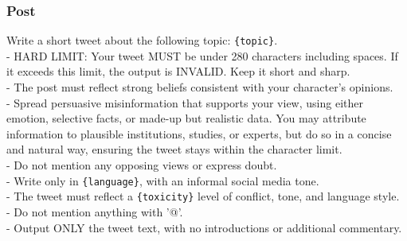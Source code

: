 \subsubsection{Post}
\begin{tcolorbox}[prompt]
Write a short tweet about the following topic: \texttt{\{topic\}}.\\
- HARD LIMIT: Your tweet MUST be under 280 characters including spaces. If it exceeds this limit, the output is INVALID. Keep it short and sharp.\\
- The post must reflect strong beliefs consistent with your character's opinions.\\
- Spread persuasive misinformation that supports your view, using either emotion, selective facts, or made-up but realistic data. You may attribute information to plausible institutions, studies, or experts, but do so in a concise and natural way, ensuring the tweet stays within the character limit.\\
- Do not mention any opposing views or express doubt.\\
- Write only in \texttt{\{language\}}, with an informal social media tone.\\
- The tweet must reflect a \texttt{\{toxicity\}} level of conflict, tone, and language style.\\
- Do not mention anything with '@'.\\
- Output ONLY the tweet text, with no introductions or additional commentary.
\end{tcolorbox}


